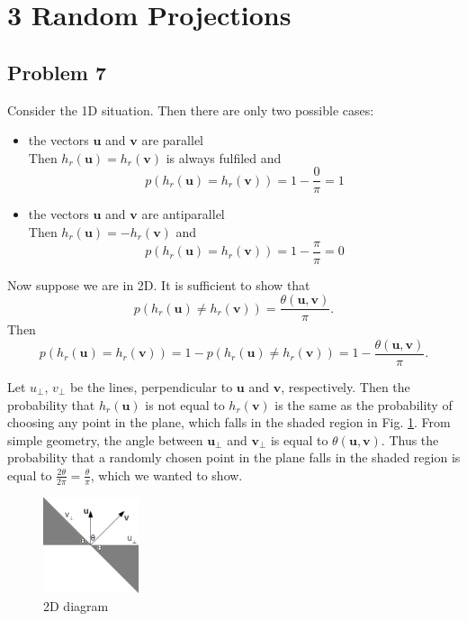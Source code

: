 \section*{3 Random Projections}

\subsection*{Problem 7}

Consider the 1D situation. Then there are only two possible cases:

\begin{itemize}
  \item the vectors $\mathbf{u}$ and $\mathbf{v}$ are parallel\\
Then $h_r(\mathbf{u}) = h_r(\mathbf{v})$ is always fulfiled and 
\[p(h_r(\mathbf{u}) = h_r(\mathbf{v})) = 1-\frac{0}{\pi} = 1\]
  \item the vectors $\mathbf{u}$ and $\mathbf{v}$ are antiparallel\\
Then $h_r(\mathbf{u}) = - h_r(\mathbf{v})$ and 
\[p(h_r(\mathbf{u}) = h_r(\mathbf{v})) = 1-\frac{\pi}{\pi} = 0\]
\end{itemize}

Now suppose we are in 2D. It is sufficient to show that \[p\left(h_r(\mathbf{u}) \neq h_r(\mathbf{v})\right)=\frac{\theta(\mathbf{u}, \mathbf{v})}{\pi}.\] Then \[p\left(h_r(\mathbf{u}) = h_r(\mathbf{v})\right) = 1-p\left(h_r(\mathbf{u}) \neq h_r(\mathbf{v})\right) = 1 - \frac{\theta(\mathbf{u}, \mathbf{v})}{\pi}.\]

Let $u_\perp$, $v_\perp$ be the lines, perpendicular to $\mathbf{u}$ and $\mathbf{v}$, respectively. Then the probability that $h_r(\mathbf{u})$ is not equal to $h_r(\mathbf{v})$ is the same as the probability of choosing any point in the plane, which falls in the shaded region in Fig. \ref{fig:theta}. From simple geometry, the angle between $\mathbf{u_\perp}$ and $\mathbf{v_\perp}$ is equal to $\theta(\mathbf{u,v})$. Thus the probability that a randomly chosen point in the plane falls in the shaded region is equal to $\frac{2\theta}{2\pi}=\frac{\theta}{\pi}$, which we wanted to show.
\begin{figure}[!h]
  \begin{center}
    \includegraphics[width=0.25\textwidth]{plots/3.png}
    \caption{2D diagram}
    \label{fig:theta}
  \end{center}
\end{figure}

